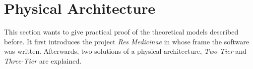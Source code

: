 %
%
%
%
%
%
%

\section{Physical Architecture}
\label{physical_architecture_heading}

This section wants to give practical proof of the theoretical models described
before. It first introduces the project \emph{Res Medicinae} in whose frame the
software was written. Afterwards, two solutions of a physical architecture,
\emph{Two-Tier} and \emph{Three-Tier} are explained.





